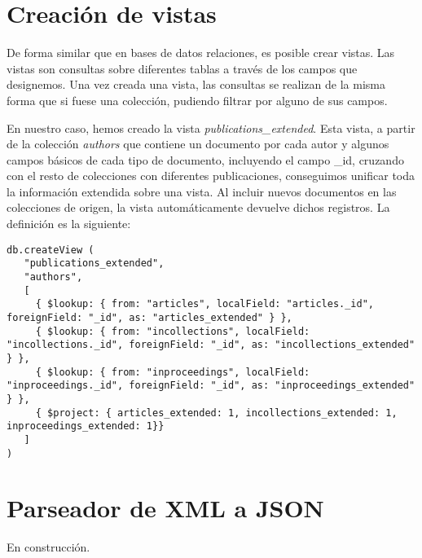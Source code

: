 \section{Creación de vistas}\label{sec:parser}

De forma similar que en bases de datos relaciones, es posible crear vistas. Las vistas son consultas sobre diferentes tablas a través de los campos que designemos. Una vez creada una vista, las consultas se realizan de la misma forma que si fuese una colección, pudiendo filtrar por alguno de sus campos.

En nuestro caso, hemos creado la vista \textit{publications_extended}. Esta vista, a partir de la colección \textit{authors} que contiene un documento por cada autor y algunos campos básicos de cada tipo de documento, incluyendo el campo _id, cruzando con el resto de colecciones con diferentes publicaciones, conseguimos unificar toda la información extendida sobre una vista. Al incluir nuevos documentos en las colecciones de origen, la vista automáticamente devuelve dichos registros. La definición es la siguiente:

\begin{verbatim}
db.createView (
   "publications_extended",
   "authors",
   [
     { $lookup: { from: "articles", localField: "articles._id", foreignField: "_id", as: "articles_extended" } },
     { $lookup: { from: "incollections", localField: "incollections._id", foreignField: "_id", as: "incollections_extended" } },
     { $lookup: { from: "inproceedings", localField: "inproceedings._id", foreignField: "_id", as: "inproceedings_extended" } },
     { $project: { articles_extended: 1, incollections_extended: 1, inproceedings_extended: 1}}
   ]
)
\end{verbatim}


\section{Parseador de XML a JSON}\label{sec:parser}

En construcción.

